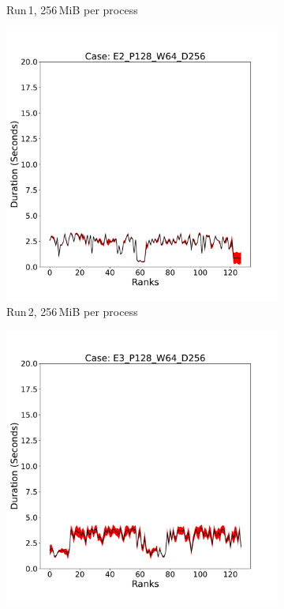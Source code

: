 \begin{figure}[h!]
\begin{subfigure}[b]{0.3\textwidth}
         \caption{Run\,1, 256\,MiB per process }
         \label{fig:E1_256_d2}
     \end{subfigure}
     \hfill
     \begin{subfigure}[b]{0.3\textwidth}
         \centering
         \includegraphics[width=\textwidth, height=\textwidth]{figures/deisa2__E2_P128_W64_D256.pdf}
         \caption{Run\,2, 256\,MiB per process}
         \label{fig:E2_256_d2}
     \end{subfigure}
      \hfill
     \begin{subfigure}[b]{0.3\textwidth}
         \centering
         \includegraphics[width=\textwidth, height=\textwidth]{figures/deisa2__E3_P128_W64_D256.pdf}

\end{subfigure}
\end{figure}
